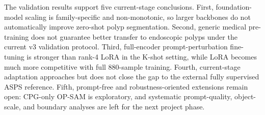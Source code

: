 The validation results support five current-stage conclusions. First, foundation-model scaling is family-specific and non-monotonic, so larger backbones do not automatically improve zero-shot polyp segmentation. Second, generic medical pre-training does not guarantee better transfer to endoscopic polyps under the current v3 validation protocol. Third, full-encoder prompt-perturbation fine-tuning is stronger than rank-4 LoRA in the K-shot setting, while LoRA becomes much more competitive with full 880-sample training. Fourth, current-stage adaptation approaches but does not close the gap to the external fully supervised ASPS reference. Fifth, prompt-free and robustness-oriented extensions remain open: CPG-only OP-SAM is exploratory, and systematic prompt-quality, object-scale, and boundary analyses are left for the next project phase.
